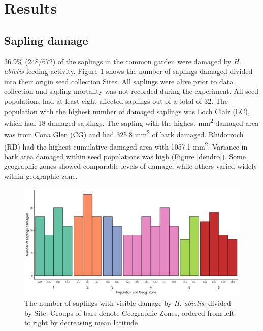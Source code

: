 \documentclass[a4paper, 11pt]{article}
\begin{document}
\section*{Results}

\subsection*{Sapling damage}

36.9\% (248/672) of the saplings in the common garden were damaged by \textit{H. abietis} feeding activity. Figure \ref{barchart} shows the number of saplings damaged divided into their origin seed collection Sites. All saplings were alive prior to data collection and sapling mortality was not recorded during the experiment. All seed populations had at least eight affected saplings out of a total of 32. The population with the highest number of damaged saplings was Loch Clair (LC), which had 18 damaged saplings. The sapling with the highest mm\textsuperscript{2} damaged area was from Cona Glen (CG) and had 325.8 mm\textsuperscript{2} of bark damaged. Rhidorroch (RD) had the highest cumulative damaged area with 1057.1 mm\textsuperscript{2}. Variance in bark area damaged within seed populations was high (Figure \ref{dendro}). Some geographic zones showed comparable levels of damage, while others varied widely within geographic zone.

\begin{figure}[H]
	\includegraphics[width=\textwidth]{barchart}
	\caption{The number of saplings with visible damage by \textit{H. abietis}, divided by Site. Groups of bars denote Geographic Zones, ordered from left to right by decreasing mean latitude}
	\label{barchart}
\end{figure}
\end{document}
